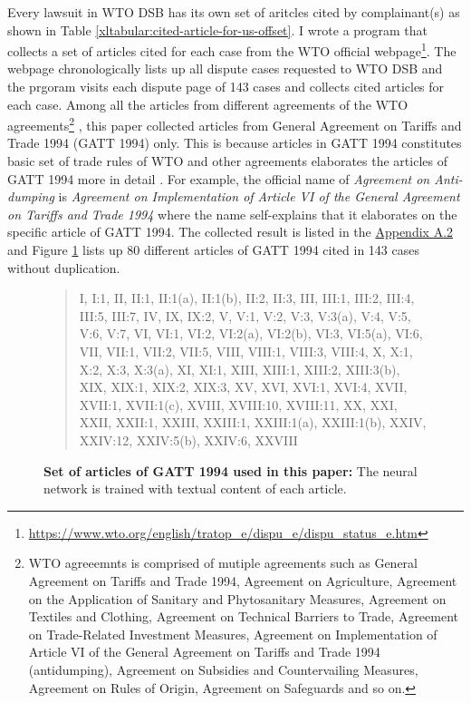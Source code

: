 Every lawsuit in WTO DSB 
has its own set of aritcles cited by complainant(s)
as shown in Table 
\ref{xltabular:cited-article-for-us-offset}. 
I wrote a program that collects a set of articles cited for 
each case from the WTO official webpage\footnote{\url{https://www.wto.org/english/tratop_e/dispu_e/dispu_status_e.htm}}. 
The webpage chronologically lists up all dispute cases
requested to WTO DSB and the prgoram visits each dispute page of 143 cases
and collects cited articles for each case. Among all the articles from different agreements
of the WTO agreements\footnote{
    WTO agreeemnts is comprised of mutiple agreements such as
    General Agreement on Tariffs and Trade 1994,
    Agreement on Agriculture,
    Agreement on the Application of Sanitary and Phytosanitary Measures,
    Agreement on Textiles and Clothing,
    Agreement on Technical Barriers to Trade,
    Agreement on Trade-Related Investment Measures,
    Agreement on Implementation of Article VI of the General Agreement on Tariffs and Trade 1994 (antidumping),
    Agreement on Subsidies and Countervailing Measures,
    Agreement on Rules of Origin,
    Agreement on Safeguards and so on.
    } ,
this paper collected articles from General Agreement on Tariffs and Trade 1994 (GATT 1994) only. 
This is because articles in GATT 1994 constitutes basic set of trade rules of WTO and other agreements 
elaborates the articles of GATT 1994 more in detail \citep{world1999wto}. For example, the official name of \textit{Agreement on Anti-dumping}
is \textit{Agreement on Implementation of Article VI of the General Agreement on Tariffs and Trade 1994}
where the name self-explains that it elaborates on the specific article of GATT 1994.
The collected result is listed in the \hyperref[sub:cited-articles-table]{Appendix A.2} and Figure \ref{fig:set-of-articles-used} 
lists up 80 different articles of GATT 1994 cited in 143 cases without duplication. 

\begin{figure}[h]
    \begin{quote}
    I, 
    I:1, 
    II, 
    II:1, 
    II:1(a), 
    II:1(b), 
    II:2, 
    II:3, 
    III, 
    III:1, 
    III:2, 
    III:4, 
    III:5, 
    III:7, 
    IV, 
    IX, 
    IX:2, 
    V, 
    V:1, 
    V:2, 
    V:3, 
    V:3(a), 
    V:4, 
    V:5, 
    V:6, 
    V:7, 
    VI, 
    VI:1, 
    VI:2, 
    VI:2(a), 
    VI:2(b), 
    VI:3, 
    VI:5(a), 
    VI:6, 
    VII, 
    VII:1, 
    VII:2, 
    VII:5, 
    VIII, 
    VIII:1, 
    VIII:3, 
    VIII:4, 
    X, 
    X:1, 
    X:2, 
    X:3, 
    X:3(a), 
    XI, 
    XI:1, 
    XIII, 
    XIII:1, 
    XIII:2, 
    XIII:3(b), 
    XIX, 
    XIX:1, 
    XIX:2, 
    XIX:3, 
    XV, 
    XVI, 
    XVI:1, 
    XVI:4, 
    XVII, 
    XVII:1, 
    XVII:1(c), 
    XVIII, 
    XVIII:10, 
    XVIII:11, 
    XX, 
    XXI, 
    XXII, 
    XXII:1, 
    XXIII, 
    XXIII:1, 
    XXIII:1(a), 
    XXIII:1(b), 
    XXIV, 
    XXIV:12, 
    XXIV:5(b), 
    XXIV:6, 
    XXVIII
    \end{quote}
    \caption{\textbf{Set of articles of GATT 1994 used in this paper: } The neural network is trained with textual content of each article.}
    \label{fig:set-of-articles-used}
\end{figure}


